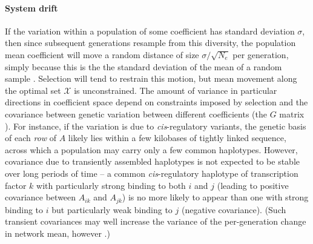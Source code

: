 \documentclass{article}
\newcommand{\1}{\mathbbm{1}}
\newcommand{\optx}{\mathcal{X}}
\begin{document}
\paragraph{System drift}
If the variation within a population of some coefficient
has standard deviation $\sigma$,
then since subsequent generations resample from this diversity,
the population mean coefficient will move a random distance of size $\sigma/\sqrt{N_e}$ per generation,
simply because this is the the standard deviation of the mean of a random sample \citep{lande_drift}.
Selection will tend to restrain this motion,
but mean movement along the optimal set $\optx$ is unconstrained.
The amount of variance in particular directions in coefficient space 
depend on constraints imposed by selection and 
the covariance between genetic variation between different coefficients (the $G$ matrix \citep{G_matrix}).
For instance,
if the variation is due to \textit{cis}-regulatory variants,
the genetic basis of each \emph{row} of $A$ likely lies within a few kilobases of tightly linked sequence,
across which a population may carry only a few common haplotypes.
However, covariance due to transiently assembled haplotypes is not expected to be stable over long periods of time --
a common \textit{cis}-regulatory haplotype of transcription factor $k$ with particularly strong binding to both $i$ and $j$
(leading to positive covariance between $A_{ik}$ and $A_{jk}$)
is no more likely to appear than one with strong binding to $i$ but particularly weak binding to $j$ (negative covariance).
(Such transient covariances may well increase the variance of the per-generation change in network mean, however \citep{barton_linkage}.)

\end{document}
